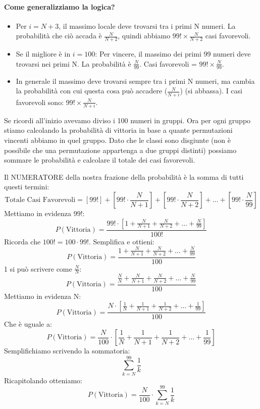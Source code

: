 \paragraph{Come generalizziamo la logica?}
\begin{itemize}
\item Per $i = N+3$, il massimo locale deve trovarsi tra i primi N numeri. La probabilità che ciò accada è $\frac{N}{N+2}$, quindi abbiamo $99! \times \frac{N}{N+2}$ casi favorevoli.

\item Se il migliore è in $i = 100$: Per vincere, il massimo dei primi 99 numeri deve trovarsi nei primi N. La probabilità è $\frac{N}{99}$. Casi favorevoli = $99! \times \frac{N}{99}$.

\item In generale il massimo deve trovarsi sempre tra i primi N numeri, ma cambia la probabilità con cui questa cosa può accadere ($\frac{N}{N+i}$) (si abbassa). I casi favorevoli sono: $99! \times \frac{N}{N+i}$.
\end{itemize}
Se ricordi all'inizio avevamo diviso i 100 numeri in gruppi. Ora per ogni gruppo stiamo calcolando la probabilità di vittoria in base a quante permutazioni vincenti abbiamo in quel gruppo. Dato che le classi sono disgiunte (non è possibile che una permutazione appartenga a due gruppi distinti) possiamo sommare le probabilità e calcolare il totale dei casi favorevoli.

Il NUMERATORE della nostra frazione della probabilità è la somma di tutti questi termini:
\[ \text{Totale Casi Favorevoli} = \left[99!\right] + \left[99! \cdot \frac{N}{N+1}\right] + \left[99! \cdot \frac{N}{N+2}\right] + \dots + \left[99! \cdot \frac{N}{99}\right] \]
Mettiamo in evidenza $99!$:
\[ P(\text{Vittoria}) = \frac{99! \cdot \left[1 + \frac{N}{N+1} + \frac{N}{N+2} + \dots + \frac{N}{99}\right]}{100!} \]
Ricorda che $100! = 100 \cdot 99!$. Semplifica e ottieni:
\[ P(\text{Vittoria}) = \frac{1 + \frac{N}{N+1} + \frac{N}{N+2} + \dots + \frac{N}{99}}{100} \]
1 si può scrivere come $\frac{N}{N}$:
\[ P(\text{Vittoria}) = \frac{\frac{N}{N} + \frac{N}{N+1} + \frac{N}{N+2} + \dots + \frac{N}{99}}{100} \]
Mettiamo in evidenza N:
\[ P(\text{Vittoria}) = \frac{N \cdot \left[\frac{1}{N} + \frac{1}{N+1} + \frac{1}{N+2} + \dots + \frac{1}{99}\right]}{100} \]
Che è uguale a:
\[ P(\text{Vittoria}) = \frac{N}{100} \cdot \left[\frac{1}{N} + \frac{1}{N+1} + \frac{1}{N+2} + \dots + \frac{1}{99}\right] \]
Semplifichiamo scrivendo la sommatoria:
\[ \sum_{k=N}^{99} \frac{1}{k} \]
Ricapitolando otteniamo:
\[ P(\text{Vittoria}) = \frac{N}{100} \cdot \sum_{k=N}^{99} \frac{1}{k} \]


